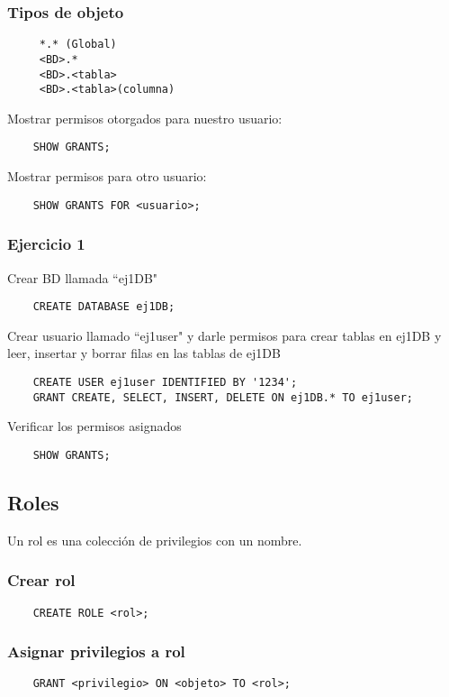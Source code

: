 \documentclass{article}
\begin{document}
\subsubsection{Tipos de objeto}
\begin{verbatim}
	 *.* (Global)
	 <BD>.* 
	 <BD>.<tabla>
	 <BD>.<tabla>(columna)

\end{verbatim}
Mostrar permisos otorgados para nuestro usuario:
\begin{verbatim}
	SHOW GRANTS;
\end{verbatim}
Mostrar permisos para otro usuario:
\begin{verbatim}
	SHOW GRANTS FOR <usuario>;
\end{verbatim}

\subsubsection{Ejercicio 1}
Crear BD llamada ``ej1DB"
\begin{verbatim}
	CREATE DATABASE ej1DB;
\end{verbatim}
Crear usuario llamado ``ej1user" y darle permisos para crear tablas en ej1DB y leer, insertar y borrar filas en las tablas de ej1DB
\begin{verbatim}
	CREATE USER ej1user IDENTIFIED BY '1234';
	GRANT CREATE, SELECT, INSERT, DELETE ON ej1DB.* TO ej1user;
\end{verbatim}
Verificar los permisos asignados
\begin{verbatim}
	SHOW GRANTS;
\end{verbatim}

\subsection{Roles}

Un rol es una colección de privilegios con un nombre.
\subsubsection{Crear rol}
\begin{verbatim}
	CREATE ROLE <rol>;
\end{verbatim}
\subsubsection{Asignar privilegios a rol}
\begin{verbatim}
	GRANT <privilegio> ON <objeto> TO <rol>;
\end{verbatim}
\end{document}
